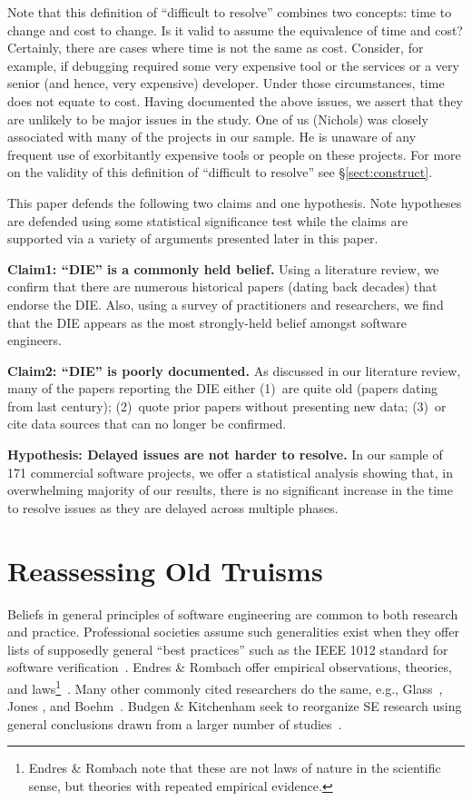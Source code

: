 \documentclass[smallcondensed]{svjour3}
\newcommand{\tion}[1]{\S\ref{sect:#1}}
\begin{document}
Note that this  definition of ``difficult to resolve''  combines two concepts: time to change and cost to change.  Is it valid to assume the equivalence of time and cost?
Certainly, there are cases where time is not the same as cost. Consider, for example, if debugging required some very expensive tool or the services or a very senior (and hence, very expensive) developer. Under those circumstances, time does not equate to cost.
Having documented the above issues, we assert that they are unlikely to be major issues in the study. One of us (Nichols) was closely associated with many of the projects in our sample. He is unaware of any frequent use of exorbitantly expensive tools or people on these projects. For more on the validity of this definition
of ``difficult to resolve'' see \tion{construct}.



This paper defends the  following two claims and one hypothesis. Note hypotheses are defended
using some statistical
significance test while the claims are  supported via a variety
of arguments presented later in this paper.

{\bf  Claim1: ``DIE'' is a  commonly held belief.}
Using a literature review, we confirm that there are numerous historical papers (dating back decades)
that endorse the DIE. Also, using a survey of practitioners and researchers, we find  that 
 the DIE  appears as the
most strongly-held belief amongst software engineers.

{\bf  Claim2: ``DIE'' is poorly documented.}
 As discussed in our literature review,  many of the papers reporting the DIE
 either (1)~are quite old (papers dating from last century);
(2)~quote prior papers without presenting   new data; 
(3)~or cite data sources that can no longer be
confirmed. 

{\bf Hypothesis: Delayed issues are not harder to resolve.}
 In our sample of 
 171 commercial software  projects, we offer  a statistical analysis showing that, in overwhelming majority
 of our results, there is no   
 significant increase in the time to resolve issues  as they are delayed across multiple phases.
 


 
 


\section{ Reassessing Old Truisms}
Beliefs in general
principles of software
engineering are common to both research and practice. Professional societies assume such generalities exist when they offer
 lists of supposedly general ``best practices'' such as
the IEEE 1012 standard for software verification~\cite{1012}. 
 Endres \& Rombach offer empirical observations, theories, and laws\footnote{Endres \& Rombach note that these are not laws of nature in the scientific sense, but theories with repeated empirical evidence.}~\cite{endres03}.
 Many other 
commonly cited researchers  do the same, e.g.,
Glass~\cite{glass02}, Jones \cite{jones07}, and Boehm~\cite{boehm00b}.
Budgen \& Kitchenham seek to reorganize SE research using
general
conclusions drawn from a larger number of studies~\cite{kitch04,budgen09}.
\end{document}
